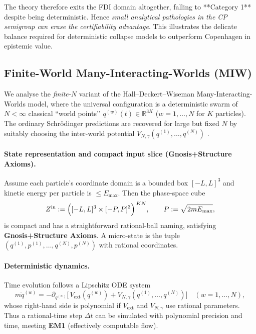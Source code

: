 \documentclass[12pt]{article}
\theoremstyle{definition}
\theoremstyle{plain}
\begin{document}
The theory therefore exits the FDI domain altogether,
falling to **Category 1** despite being deterministic.
Hence \emph{small analytical pathologies in the CP semigroup can
erase the certifiability advantage}.  This illustrates the delicate
balance required for deterministic collapse models to outperform
Copenhagen in epistemic value.



\subsection{Finite-World Many-Interacting-Worlds (MIW)}
\label{subsec:miw-finite}

We analyse the \emph{finite-$N$} variant of the Hall–Deckert–Wiseman
Many-Interacting-Worlds model, where the universal configuration is a
deterministic swarm of $N\!<\!\infty$ classical “world points’’
$q^{(w)}(t)\in\mathbb R^{3K}$ ($w=1,\dots,N$ for $K$ particles).  The
ordinary Schrödinger predictions are recovered for large but fixed $N$
by suitably choosing the inter-world potential
$V_{N,\gamma}(q^{(1)},\dots,q^{(N)})$ \cite{HallDeckertWiseman2014}.

\paragraph{State representation and compact input slice (Gnosis+Structure Axioms).}
Assume each particle’s coordinate domain is a bounded box
$[-L,L]^3$ and kinetic energy per particle is $\le E_{\max}$.  Then the
phase-space cube
\[
   Z^{\mathrm{in}}
   :=\Bigl([-L,L]^3\times[-P,P]^3\Bigr)^{\,K N},
   \qquad P:=\sqrt{2mE_{\max}},
\]
is compact and has a straightforward rational-ball naming, satisfying
\textbf{Gnosis+Structure Axioms}.  A micro-state is the tuple
\((q^{(1)},p^{(1)},\dots,q^{(N)},p^{(N)})\) with rational coordinates.

\paragraph{Deterministic dynamics.}
Time evolution follows a Lipschitz ODE system
\[
   m\ddot q^{(w)} = -\partial_{q^{(w)}}\!
   \bigl[\,V_{\mathrm{ext}}(q^{(w)})
          +V_{N,\gamma}(q^{(1)},\dots,q^{(N)})\bigr]
   \quad (w=1,\dots,N),
\]
whose right-hand side is polynomial if $V_{\mathrm{ext}}$ and
$V_{N,\gamma}$ use rational parameters.  Thus a rational-time step
$\Delta t$ can be simulated with polynomial precision and time, meeting
\textbf{EM1} (effectively computable flow).
\end{document}
